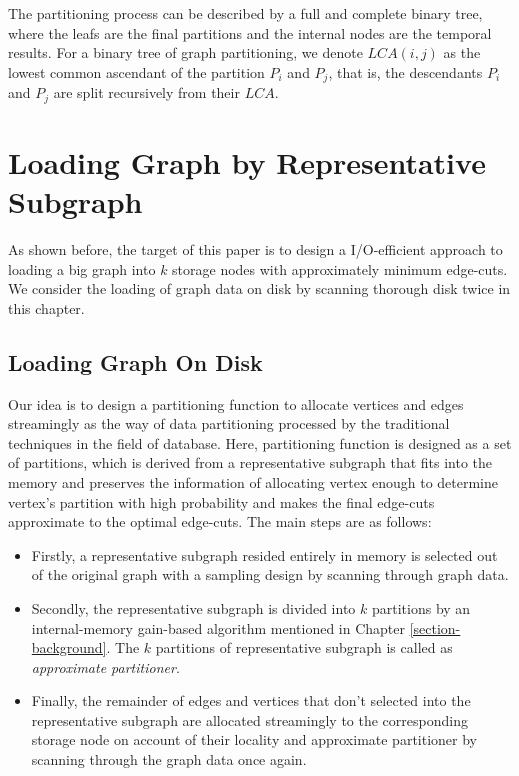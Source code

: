 \documentclass{sig-alternate-2013}
\begin{document}
The partitioning process can be described by a full and complete binary tree, where the leafs are the final partitions and the internal nodes are the temporal results. For a binary tree of graph partitioning, we denote $LCA(i, j)$ as the lowest common ascendant of  the partition $P_i$ and $P_j$, that is, the descendants $P_i$ and $P_j$ are split recursively from their $LCA$.


\section{ Loading Graph by Representative Subgraph }

As shown before, the target of this paper is to design a I/O-efficient approach to loading a big graph into $k$ storage nodes with approximately minimum edge-cuts. We consider the loading of graph data on disk by scanning thorough disk twice in this chapter.

\subsection{Loading Graph On Disk}

Our idea is to design a partitioning function to allocate vertices and edges streamingly as  the way of data partitioning processed by the traditional techniques in the field of database. Here, partitioning function is designed as a set of partitions, which is derived from a representative subgraph that fits into the memory and preserves the information of allocating vertex enough to determine vertex's partition with high probability and makes the final edge-cuts approximate to the optimal edge-cuts. The main steps are as follows:
\begin{itemize}
\item Firstly, a representative subgraph resided entirely in memory is selected out of the original graph with a sampling design by scanning through graph data.
\item Secondly, the representative subgraph is divided into $k$ partitions by an internal-memory gain-based algorithm mentioned in Chapter \ref{section-background}. The $k$ partitions of representative subgraph is called as \textit{approximate partitioner}.
\item Finally, the remainder of edges and vertices that don't selected into the representative subgraph are allocated streamingly to the corresponding storage node on account of their locality and approximate partitioner by scanning through the graph data once again.
\end{itemize}
\end{document}
